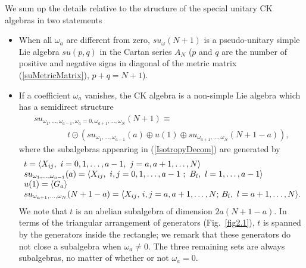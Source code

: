 \documentclass[12pt]{article}
\begin{document}
We sum up the details relative to the structure of the special unitary
CK algebras in two statements
\begin{itemize}
\item
When all ${\omega}_a$  are different from zero,
$su_{\omega}(N+1)$ is a  pseudo-unitary simple Lie algebra
$su({p,q})$ in the  Cartan series $A_N$ ($p$ and $q$ are the number
of positive and negative signs in diagonal of the metric matrix
(\ref{suMetricMatrix}), $p+q=N+1$).

\item
If a coefficient ${\omega}_a$ vanishes, the CK algebra is a
non-simple Lie algebra which has a semidirect structure
\begin{equation}
\begin{array}{l}
su_{{\omega}_1,\dots,{\omega}_{a-1},{\omega}_a=0,{\omega}_{a+1},\dots,{\omega}_N}(N+1)
\equiv \\
\qquad\qquad
t \odot
( su_{{\omega}_1,\dots,{\omega}_{a-1}}(a)
\oplus
u(1)
\oplus
su_{{\omega}_{a+1},\dots,{\omega}_N}(N+1-a)),
\end{array}
\label{IsotropyDecom}
\end{equation}
where the subalgebras appearing in (\ref{IsotropyDecom}) are
generated by
\begin{equation}
\begin{array}{l}
t=\langle {X}_{ij},\ i=0,1,\dots,a-1,\
             j=a,a+1,\dots,N\rangle \cr
su_{{\omega}_1,\dots,{\omega}_{a-1}}(a) =\langle
    {X}_{ij},\ i,j=0,1,\dots,a-1\ ;\
    {B}_l,\ l=1, \dots ,a-1 \rangle \cr
u(1) = \langle {G}_a \rangle \cr
su_{{\omega}_{a+1},\dots,{\omega}_N}(N+1-a) =\langle
    {X}_{ij},\, i,j=a,a+1,\dots,N;\,
    {B}_l,\ l=a+1, \dots,N \rangle.
\end{array}
\label{aia}
\end{equation}
We note that $t$ is an abelian subalgebra of dimension $2a(N+1-a)$. In
terms of the triangular arrangement of generators (Fig.~\ref{fig2.1}), $t$
is spanned by the generators inside the rectangle; we remark that these
generators do not close a subalgebra when ${\omega}_a\neq 0$. The three remaining
sets are always subalgebras, no matter of whether or not ${\omega}_a=0$.
\end{itemize}
\end{document}
